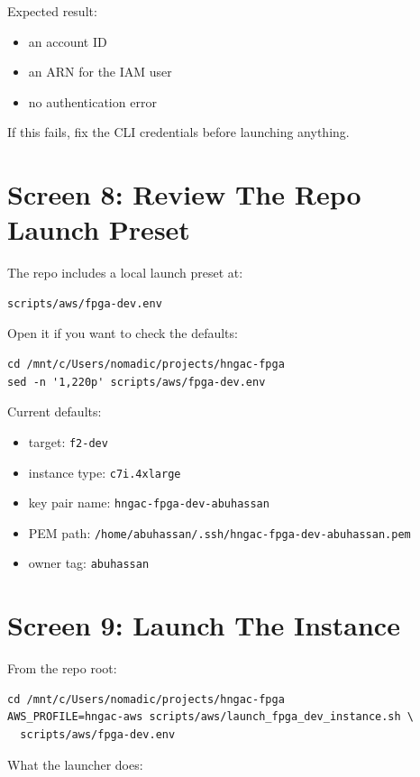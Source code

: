 \documentclass[11pt]{article}
\begin{document}
Expected result:

\begin{itemize}
\item an account ID
\item an ARN for the IAM user
\item no authentication error
\end{itemize}

If this fails, fix the CLI credentials before launching anything.

\section*{Screen 8: Review The Repo Launch Preset}

The repo includes a local launch preset at:

\begin{verbatim}
scripts/aws/fpga-dev.env
\end{verbatim}

Open it if you want to check the defaults:

\begin{verbatim}
cd /mnt/c/Users/nomadic/projects/hngac-fpga
sed -n '1,220p' scripts/aws/fpga-dev.env
\end{verbatim}

Current defaults:

\begin{itemize}
\item target: \texttt{f2-dev}
\item instance type: \texttt{c7i.4xlarge}
\item key pair name: \texttt{hngac-fpga-dev-abuhassan}
\item PEM path: \texttt{/home/abuhassan/.ssh/hngac-fpga-dev-abuhassan.pem}
\item owner tag: \texttt{abuhassan}
\end{itemize}

\section*{Screen 9: Launch The Instance}

From the repo root:

\begin{verbatim}
cd /mnt/c/Users/nomadic/projects/hngac-fpga
AWS_PROFILE=hngac-aws scripts/aws/launch_fpga_dev_instance.sh \
  scripts/aws/fpga-dev.env
\end{verbatim}

What the launcher does:
\end{document}
